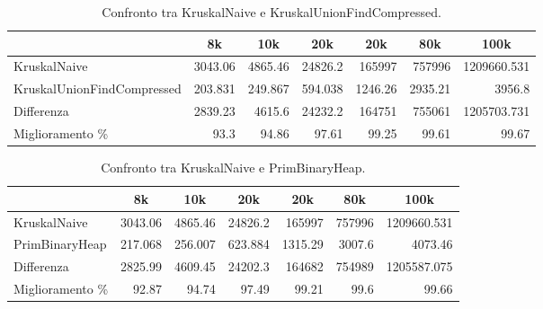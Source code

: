 \begin{table}[H]
\centering
    \hspace*{-1cm}
    \begin{tabular}{|l|rrrrrr|}
    \hline
    &  \multicolumn{1}{c}{8k} & \multicolumn{1}{c}{10k} & \multicolumn{1}{c}{20k} & \multicolumn{1}{c}{20k} & \multicolumn{1}{c}{80k} &           \multicolumn{1}{c|}{100k} \\
    \hline
     KruskalNaive               & 3043.06  & 4865.46  & 24826.2   & 165997    & 757996    &    1209660.531 \\
     KruskalUnionFindCompressed &  203.831 &  249.867 &   594.038 &   1246.26 &   2935.21 & 3956.8         \\ \hline
     Differenza                 & 2839.23  & 4615.6   & 24232.2   & 164751    & 755061    &    1205703.731 \\
     Miglioramento \%            &   93.3   &   94.86  &    97.61  &     99.25 &     99.61 &   99.67          \\
    \hline
    \end{tabular}
    \caption{Confronto tra KruskalNaive e KruskalUnionFindCompressed.}
    \label{table:kruskal-naive-vs-kruskal-union-find-compressed}
\end{table}

\begin{table}[H]
\centering
    \begin{tabular}{|l|rrrrrr|}
    \hline
    &  \multicolumn{1}{c}{8k} & \multicolumn{1}{c}{10k} & \multicolumn{1}{c}{20k} & \multicolumn{1}{c}{20k} & \multicolumn{1}{c}{80k} &           \multicolumn{1}{c|}{100k} \\
    \hline
     KruskalNaive      & 3043.06  & 4865.46  & 24826.2   & 165997    & 757996   & 1209660.531 \\
     PrimBinaryHeap    &  217.068 &  256.007 &   623.884 &   1315.29 &   3007.6 & 4073.46        \\ \hline
     Differenza        & 2825.99  & 4609.45  & 24202.3   & 164682    & 754989   & 1205587.075 \\
     Miglioramento \%   &   92.87  &   94.74  &    97.49  &     99.21 &     99.6 &   99.66       \\
    \hline
    \end{tabular}
    \caption{Confronto tra KruskalNaive e PrimBinaryHeap.}
    \label{table:kruskal-naive-vs-prim-binary-heap}
\end{table}

